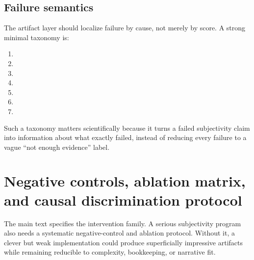 \documentclass[11pt,a4paper]{article}
\theoremstyle{definition}
\begin{document}
\subsection{Failure semantics}
The artifact layer should localize failure by cause, not merely by score. A strong minimal taxonomy is:
\begin{enumerate}[leftmargin=1.5em]
\item \texttt{\allowbreak{}\allowbreak{}\allowbreak{}}
\item \texttt{\allowbreak{}\allowbreak{}\allowbreak{}}
\item \texttt{\allowbreak{}\allowbreak{}\allowbreak{}}
\item \texttt{\allowbreak{}}
\item \texttt{\allowbreak{}\allowbreak{}}
\item \texttt{\allowbreak{}\allowbreak{}\allowbreak{}}
\item \texttt{\allowbreak{}\allowbreak{}}
\end{enumerate}
Such a taxonomy matters scientifically because it turns a failed subjectivity claim into information about what exactly failed, instead of reducing every failure to a vague ``not enough evidence'' label.

\section{Negative controls, ablation matrix, and causal discrimination protocol}
The main text specifies the intervention family. A serious subjectivity program also needs a systematic negative-control and ablation protocol. Without it, a clever but weak implementation could produce superficially impressive artifacts while remaining reducible to complexity, bookkeeping, or narrative fit.
\end{document}
